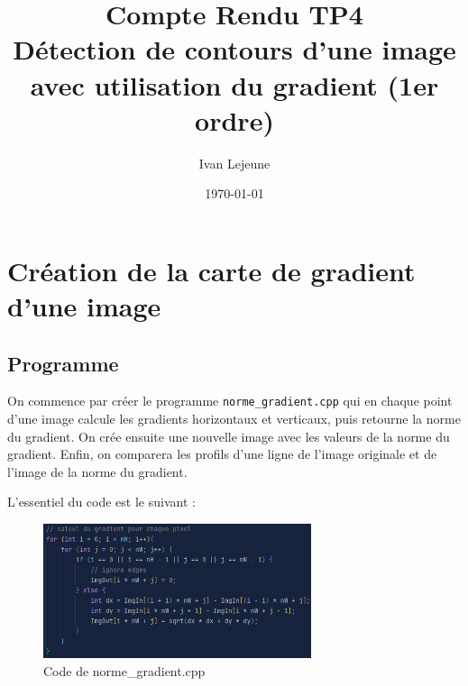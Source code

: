 \documentclass[french,a4paper,10pt]{article}
\title{Compte Rendu TP4\\
Détection de contours d'une image\\
avec utilisation du gradient (1er ordre)}
\author{Ivan Lejeune}
\date{\today}
\begin{document}
    \maketitle

    \tableofcontents

    \newpage
    \section{Création de la carte de gradient d'une image}\label{sec:1}

    \subsection{Programme}\label{subsec:1.1}

    On commence par créer le programme \texttt{norme\_gradient.cpp} qui en chaque point d'une image calcule les
    gradients horizontaux et verticaux, puis retourne la norme du gradient.
    On crée ensuite une nouvelle image avec les valeurs de la norme du gradient.
    Enfin, on comparera les profils d'une ligne de l'image originale et de l'image de la norme du gradient.

    L'essentiel du code est le suivant : %
    \begin{figure}[!htb]
        \centering
        \includegraphics[width=0.7\textwidth]{out/code-norme-gradient}
        \caption{Code de norme\_gradient.cpp}\label{fig:code-norme-gradient}
    \end{figure}
\end{document}
